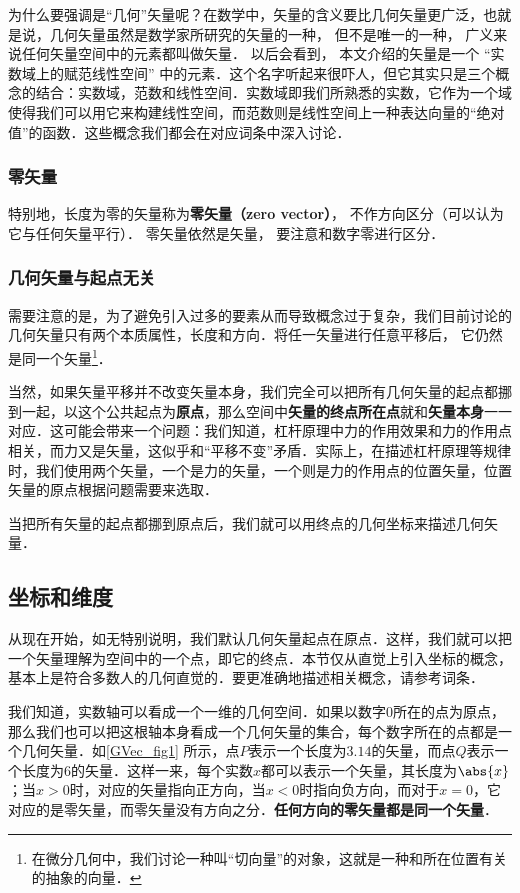 为什么要强调是“几何”矢量呢？在数学中，矢量的含义要比几何矢量更广泛，也就是说，几何矢量虽然是数学家所研究的矢量的一种， 但不是唯一的一种， 广义来说任何矢量空间中的元素都叫做矢量． 以后会看到， 本文介绍的矢量是一个 “实数域上的赋范线性空间” 中的元素．这个名字听起来很吓人，但它其实只是三个概念的结合：实数域，范数和线性空间．实数域即我们所熟悉的实数，它作为一个域使得我们可以用它来构建线性空间，而范数则是线性空间上一种表达向量的“绝对值”的函数．这些概念我们都会在对应词条中深入讨论．

\subsubsection{零矢量}
特别地，长度为零的矢量称为\textbf{零矢量（zero vector）}， 不作方向区分（可以认为它与任何矢量平行）． 零矢量依然是矢量， 要注意和数字零进行区分．

\subsubsection{几何矢量与起点无关}
需要注意的是，为了避免引入过多的要素从而导致概念过于复杂，我们目前讨论的几何矢量只有两个本质属性，长度和方向．将任一矢量进行任意平移后， 它仍然是同一个矢量\footnote{在微分几何中，我们讨论一种叫“切向量”的对象，这就是一种和所在位置有关的抽象的向量．}．

当然，如果矢量平移并不改变矢量本身，我们完全可以把所有几何矢量的起点都挪到一起，以这个公共起点为\textbf{原点}，那么空间中\textbf{矢量的终点所在点}就和\textbf{矢量本身}一一对应．这可能会带来一个问题：我们知道，杠杆原理中力的作用效果和力的作用点相关，而力又是矢量，这似乎和“平移不变”矛盾．实际上，在描述杠杆原理等规律时，我们使用两个矢量，一个是力的矢量，一个则是力的作用点的位置矢量，位置矢量的原点根据问题需要来选取．

当把所有矢量的起点都挪到原点后，我们就可以用终点的几何坐标来描述几何矢量．

\subsection{坐标和维度}
从现在开始，如无特别说明，我们默认几何矢量起点在原点．这样，我们就可以把一个矢量理解为空间中的一个点，即它的终点．本节仅从直觉上引入坐标的概念，基本上是符合多数人的几何直觉的．要更准确地描述相关概念，请参考词条．

我们知道，实数轴可以看成一个一维的几何空间．如果以数字$0$所在的点为原点，那么我们也可以把这根轴本身看成一个几何矢量的集合，每个数字所在的点都是一个几何矢量．如\autoref{GVec_fig1} 所示，点$P$表示一个长度为$3.14$的矢量，而点$Q$表示一个长度为$6$的矢量．这样一来，每个实数$x$都可以表示一个矢量，其长度为$\abs{x}$；当$x>0$时，对应的矢量指向正方向，当$x<0$时指向负方向，而对于$x=0$，它对应的是零矢量，而零矢量没有方向之分．\textbf{任何方向的零矢量都是同一个矢量}．

